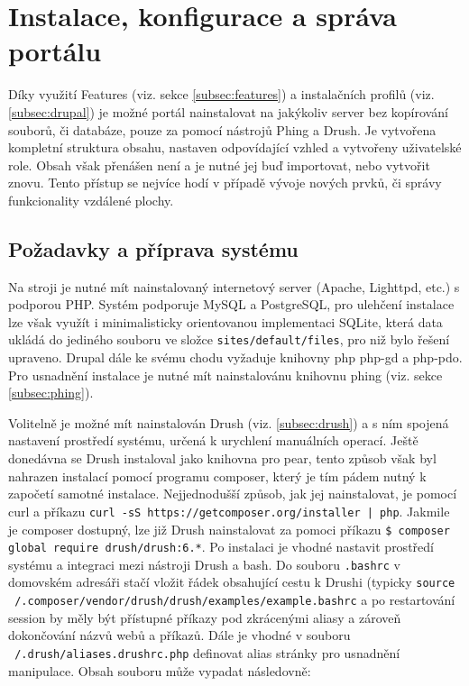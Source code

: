 \chapter{Instalace, konfigurace a správa portálu}
\label{chap:instalace}

Díky využití Features (viz. sekce \ref{subsec:features}) a instalačních profilů (viz. \ref{subsec:drupal}) je možné portál nainstalovat na jakýkoliv server bez kopírování souborů, či databáze, pouze za pomocí nástrojů Phing a Drush. Je vytvořena kompletní struktura obsahu, nastaven odpovídající vzhled a vytvořeny uživatelské role. Obsah však přenášen není a je nutné jej buď importovat, nebo vytvořit znovu. Tento přístup se nejvíce hodí v případě vývoje nových prvků, či správy funkcionality vzdálené plochy.

\section{Požadavky a příprava systému}

Na stroji je nutné mít nainstalovaný internetový server (Apache, Lighttpd, etc.) s podporou PHP. Systém podporuje MySQL a PostgreSQL, pro ulehčení instalace lze však využít i minimalisticky orientovanou implementaci SQLite, která data ukládá do jediného souboru ve složce \texttt{sites/default/files}, pro niž bylo řešení upraveno. Drupal dále ke svému chodu vyžaduje knihovny php php-gd a php-pdo. Pro usnadnění instalace je nutné mít nainstalovánu knihovnu phing (viz. sekce \ref{subsec:phing}).

Volitelně je možné mít nainstalován Drush (viz. \ref{subsec:drush}) a s ním spojená nastavení prostředí systému, určená k urychlení manuálních operací. Ještě donedávna se Drush instaloval jako knihovna pro \gls{pear}, tento způsob však byl nahrazen instalací pomocí programu \gls{composer}, který je tím pádem nutný k započetí samotné instalace. Nejjednodušší způsob, jak jej nainstalovat, je pomocí \gls{curl} a příkazu \texttt{curl -sS https://getcomposer.org/installer | php}. Jakmile je composer dostupný, lze již Drush nainstalovat za pomoci příkazu \texttt{\$ composer global require drush/drush:6.*}. Po instalaci je vhodné nastavit prostředí systému a integraci mezi nástroji Drush a \gls{bash}. Do souboru \texttt{.bashrc} v domovském adresáři stačí vložit řádek obsahující cestu k Drushi (typicky \texttt{source ~/.composer/vendor/drush/drush/examples/example.bashrc} a po restartování \gls{session} by měly být přístupné příkazy pod zkrácenými aliasy a zároveň dokončování názvů webů a příkazů. Dále je vhodné v souboru \texttt{~/.drush/aliases.drushrc.php} definovat alias stránky pro usnadnění manipulace. Obsah souboru může vypadat následovně:

